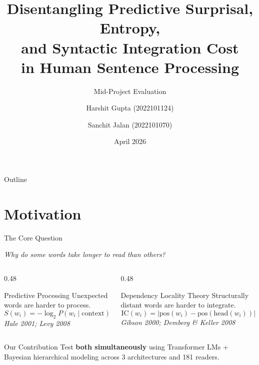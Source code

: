 \documentclass[aspectratio=169]{beamer}
\title[Surprisal, Entropy \& Integration Cost]{%
  Disentangling Predictive Surprisal, Entropy,\\
  and Syntactic Integration Cost\\
  in Human Sentence Processing}
\subtitle{Mid-Project Evaluation}
\author[Gupta \& Jalan]{%
  Harshit Gupta (2022101124) \and Sanchit Jalan (2022101070)}
\date{April 2026}
\begin{document}

\begin{frame}
  \titlepage
\end{frame}

\begin{frame}{Outline}
  \tableofcontents
\end{frame}

\section{Motivation}

\begin{frame}{The Core Question}

  \begin{center}
    \Large\textit{Why do some words take longer to read than others?}
  \end{center}

  \vspace{0.5em}
  \begin{columns}[T]
    \begin{column}{0.48\textwidth}
      \begin{block}{Predictive Processing}
        Unexpected words are harder to process.
        \[
          S(w_i) = -\log_2 P(w_i \mid \text{context})
        \]
        \textit{Hale 2001; Levy 2008}
      \end{block}
    \end{column}
    \begin{column}{0.48\textwidth}
      \begin{block}{Dependency Locality Theory}
        Structurally distant words are harder to integrate.
        \[
          \text{IC}(w_i) = |\text{pos}(w_i) - \text{pos}(\text{head}(w_i))|
        \]
        \textit{Gibson 2000; Demberg \& Keller 2008}
      \end{block}
    \end{column}
  \end{columns}

  \vspace{0.8em}
  \begin{alertblock}{Our Contribution}
    Test \textbf{both simultaneously} using Transformer LMs + Bayesian hierarchical
    modeling across 3 architectures and 181 readers.
  \end{alertblock}
\end{frame}
\end{document}
